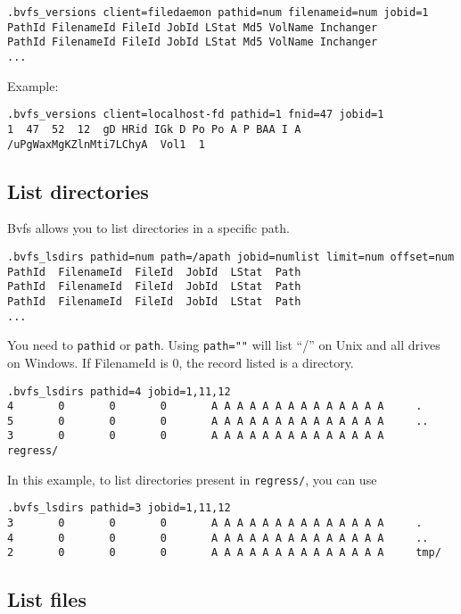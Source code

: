\begin{verbatim}
.bvfs_versions client=filedaemon pathid=num filenameid=num jobid=1
PathId FilenameId FileId JobId LStat Md5 VolName Inchanger
PathId FilenameId FileId JobId LStat Md5 VolName Inchanger
...
\end{verbatim}

Example:

\begin{verbatim}
.bvfs_versions client=localhost-fd pathid=1 fnid=47 jobid=1
1  47  52  12  gD HRid IGk D Po Po A P BAA I A   /uPgWaxMgKZlnMti7LChyA  Vol1  1
\end{verbatim}

\subsection*{List directories}

Bvfs allows you to list directories in a specific path.
\begin{verbatim}
.bvfs_lsdirs pathid=num path=/apath jobid=numlist limit=num offset=num
PathId  FilenameId  FileId  JobId  LStat  Path
PathId  FilenameId  FileId  JobId  LStat  Path
PathId  FilenameId  FileId  JobId  LStat  Path
...
\end{verbatim}

You need to \texttt{pathid} or \texttt{path}. Using \texttt{path=""} will list
``/'' on Unix and all drives on Windows.  If FilenameId is 0, the record
listed is a directory.

\begin{verbatim}
.bvfs_lsdirs pathid=4 jobid=1,11,12
4       0       0       0       A A A A A A A A A A A A A A     .
5       0       0       0       A A A A A A A A A A A A A A     ..
3       0       0       0       A A A A A A A A A A A A A A     regress/
\end{verbatim}

In this example, to list directories present in \texttt{regress/}, you can use
\begin{verbatim}
.bvfs_lsdirs pathid=3 jobid=1,11,12
3       0       0       0       A A A A A A A A A A A A A A     .
4       0       0       0       A A A A A A A A A A A A A A     ..
2       0       0       0       A A A A A A A A A A A A A A     tmp/
\end{verbatim}

\subsection*{List files}

